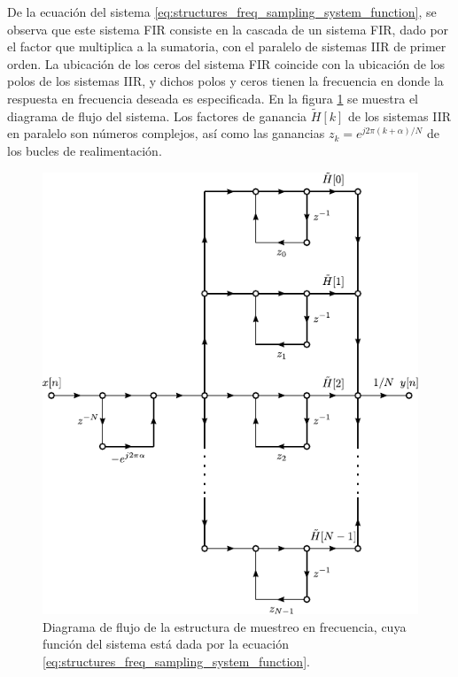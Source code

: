 \documentclass[a4paper]{report}
\begin{document}
De la ecuación del sistema \ref{eq:structures_freq_sampling_system_function}, se observa que este sistema FIR consiste en la cascada de un sistema FIR, dado por el factor que multiplica a la sumatoria, con el paralelo de sistemas IIR de primer orden. La ubicación de los ceros del sistema FIR coincide con la ubicación de los polos de los sistemas IIR, y dichos polos y ceros tienen la frecuencia en donde la respuesta en frecuencia deseada es especificada. En la figura \ref{fig:structures_frequency_sampling_flow_graph} se muestra el diagrama de flujo del sistema. Los factores de ganancia \(\tilde{H}[k]\) de los sistemas IIR en paralelo son números complejos, así como las ganancias \(z_k=e^{j2\pi(k+\alpha)/N}\) de los bucles de realimentación. 
\begin{figure}[!htb]
 \begin{minipage}[c]{0.72\textwidth}
  \includegraphics[width=\textwidth]{figuras/structures_frequency_sampling_flow_graph.pdf}
 \end{minipage}\hfill
 \begin{minipage}[c]{0.18\textwidth}
  \caption{
   Diagrama de flujo de la estructura de muestreo en frecuencia, cuya función del sistema está dada por la ecuación \ref{eq:structures_freq_sampling_system_function}.
   }\label{fig:structures_frequency_sampling_flow_graph}
 \end{minipage}
\end{figure}   
\end{document}
